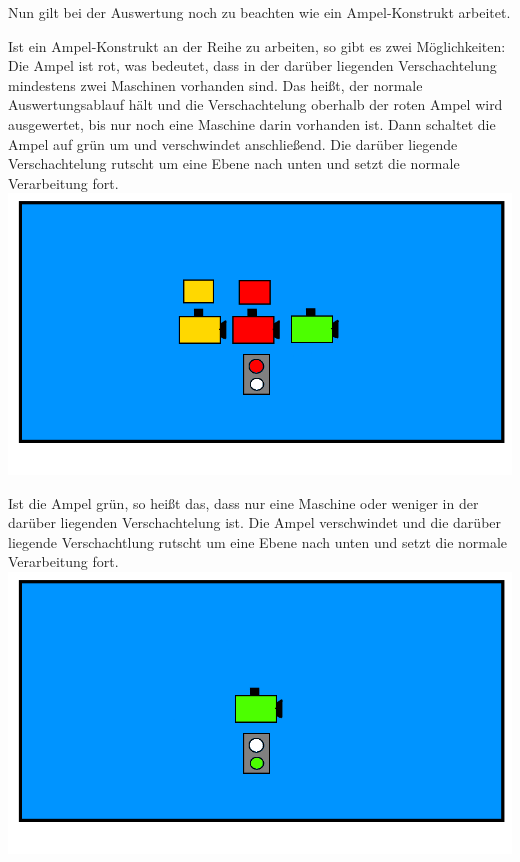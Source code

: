 \documentclass{scrartcl}
\begin{document}
\begin{description}
			Nun gilt bei der Auswertung noch zu beachten wie ein Ampel-Konstrukt arbeitet.\\
			
		\begin{minipage}{1\textwidth}
			Ist ein Ampel-Konstrukt an der Reihe zu arbeiten, so gibt es zwei Möglichkeiten:\\
			Die Ampel ist rot, was bedeutet, dass in der darüber liegenden Verschachtelung mindestens zwei Maschinen vorhanden sind. Das heißt, der normale Auswertungsablauf hält und die Verschachtelung oberhalb der roten Ampel wird ausgewertet, bis nur noch eine Maschine darin vorhanden ist. Dann schaltet die Ampel auf grün um und verschwindet anschließend. Die darüber liegende Verschachtelung rutscht um eine Ebene nach unten und setzt die normale Verarbeitung fort.\\ 
			\includegraphics[scale=0.5]{assets/AuswertungAmpelRot}
		\end{minipage}
		
		\begin{minipage}{1\textwidth}
			Ist die Ampel grün, so heißt das, dass nur eine Maschine oder weniger in der darüber liegenden Verschachtelung ist. Die Ampel verschwindet und die darüber liegende Verschachtlung rutscht um eine Ebene nach unten und setzt die normale Verarbeitung fort.\\  
			\includegraphics[scale=0.5]{assets/AsuwertungAmpelGrun}
		\end{minipage}


\end{description}
\end{document}
